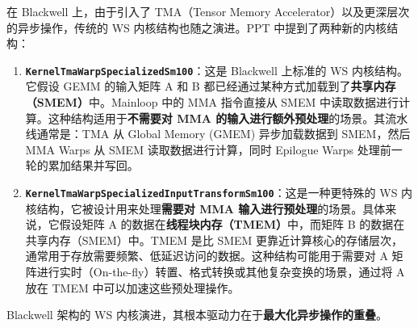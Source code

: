 在 Blackwell 上，由于引入了 TMA（Tensor Memory Accelerator）以及更深层次的异步操作，传统的 WS 内核结构也随之演进。PPT 中提到了两种新的内核结构：

\begin{enumerate}
\item \textbf{\texttt{K\allowbreak{}e\allowbreak{}r\allowbreak{}n\allowbreak{}e\allowbreak{}l\allowbreak{}T\allowbreak{}m\allowbreak{}a\allowbreak{}W\allowbreak{}a\allowbreak{}r\allowbreak{}p\allowbreak{}S\allowbreak{}p\allowbreak{}e\allowbreak{}c\allowbreak{}i\allowbreak{}a\allowbreak{}l\allowbreak{}i\allowbreak{}z\allowbreak{}e\allowbreak{}d\allowbreak{}S\allowbreak{}m\allowbreak{}1\allowbreak{}0\allowbreak{}0}}：这是 Blackwell 上标准的 WS 内核结构。它假设 GEMM 的输入矩阵 A 和 B 都已经通过某种方式加载到了\textbf{共享内存（SMEM）}中。Mainloop 中的 MMA 指令直接从 SMEM 中读取数据进行计算。这种结构适用于\textbf{不需要对 MMA 的输入进行额外预处理}的场景。其流水线通常是：TMA 从 Global Memory (GMEM) 异步加载数据到 SMEM，然后 MMA Warps 从 SMEM 读取数据进行计算，同时 Epilogue Warps 处理前一轮的累加结果并写回。
\item \textbf{\texttt{K\allowbreak{}e\allowbreak{}r\allowbreak{}n\allowbreak{}e\allowbreak{}l\allowbreak{}T\allowbreak{}m\allowbreak{}a\allowbreak{}W\allowbreak{}a\allowbreak{}r\allowbreak{}p\allowbreak{}S\allowbreak{}p\allowbreak{}e\allowbreak{}c\allowbreak{}i\allowbreak{}a\allowbreak{}l\allowbreak{}i\allowbreak{}z\allowbreak{}e\allowbreak{}d\allowbreak{}I\allowbreak{}n\allowbreak{}p\allowbreak{}u\allowbreak{}t\allowbreak{}T\allowbreak{}r\allowbreak{}a\allowbreak{}n\allowbreak{}s\allowbreak{}f\allowbreak{}o\allowbreak{}r\allowbreak{}m\allowbreak{}S\allowbreak{}m\allowbreak{}1\allowbreak{}0\allowbreak{}0}}：这是一种更特殊的 WS 内核结构，它被设计用来处理\textbf{需要对 MMA 输入进行预处理}的场景。具体来说，它假设矩阵 A 的数据在\textbf{线程块内存（TMEM）}中，而矩阵 B 的数据在共享内存（SMEM）中。TMEM 是比 SMEM 更靠近计算核心的存储层次，通常用于存放需要频繁、低延迟访问的数据。这种结构可能用于需要对 A 矩阵进行实时（On-the-fly）转置、格式转换或其他复杂变换的场景，通过将 A 放在 TMEM 中可以加速这些预处理操作。
\end{enumerate}

Blackwell 架构的 WS 内核演进，其根本驱动力在于\textbf{最大化异步操作的重叠}。

